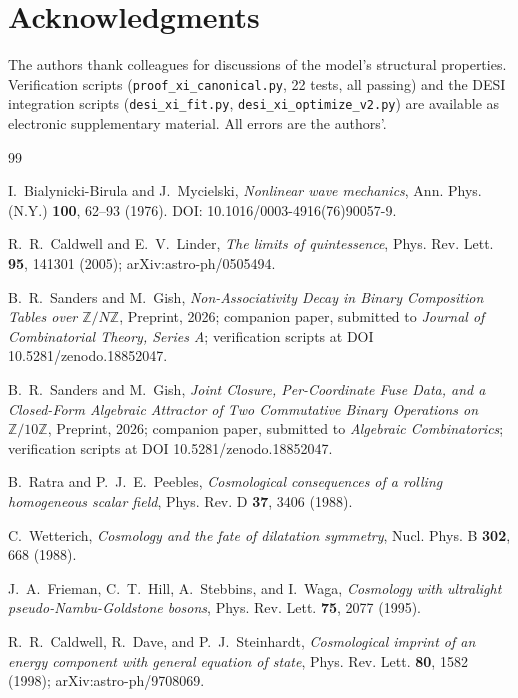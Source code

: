 \documentclass[11pt,reqno]{amsart}
\theoremstyle{plain}
\theoremstyle{definition}
\theoremstyle{remark}
\begin{document}
\section*{Acknowledgments}

The authors thank colleagues for discussions of the model's structural
properties. Verification scripts (\texttt{proof\_xi\_canonical.py}, 22
tests, all passing) and the DESI integration scripts
(\texttt{desi\_xi\_fit.py}, \texttt{desi\_xi\_optimize\_v2.py}) are available
as electronic supplementary material. All errors are the authors'.

\begin{thebibliography}{99}

I.~Bialynicki-Birula and J.~Mycielski,
\emph{Nonlinear wave mechanics},
Ann. Phys. (N.Y.) \textbf{100}, 62--93 (1976).
DOI: 10.1016/0003-4916(76)90057-9.

R.~R.~Caldwell and E.~V.~Linder,
\emph{The limits of quintessence},
Phys. Rev. Lett. \textbf{95}, 141301 (2005); arXiv:astro-ph/0505494.

B.~R.~Sanders and M.~Gish,
\emph{Non-Associativity Decay in Binary Composition Tables over
$\mathbb{Z}/N\mathbb{Z}$},
Preprint, 2026; companion paper, submitted to
\emph{Journal of Combinatorial Theory, Series A};
verification scripts at DOI 10.5281/zenodo.18852047.

B.~R.~Sanders and M.~Gish,
\emph{Joint Closure, Per-Coordinate Fuse Data, and a Closed-Form
Algebraic Attractor of Two Commutative Binary Operations on
$\mathbb{Z}/10\mathbb{Z}$},
Preprint, 2026; companion paper, submitted to
\emph{Algebraic Combinatorics};
verification scripts at DOI 10.5281/zenodo.18852047.

B.~Ratra and P.~J.~E.~Peebles,
\emph{Cosmological consequences of a rolling homogeneous scalar field},
Phys. Rev. D \textbf{37}, 3406 (1988).

C.~Wetterich,
\emph{Cosmology and the fate of dilatation symmetry},
Nucl. Phys. B \textbf{302}, 668 (1988).

J.~A.~Frieman, C.~T.~Hill, A.~Stebbins, and I.~Waga,
\emph{Cosmology with ultralight pseudo-Nambu-Goldstone bosons},
Phys. Rev. Lett. \textbf{75}, 2077 (1995).

R.~R.~Caldwell, R.~Dave, and P.~J.~Steinhardt,
\emph{Cosmological imprint of an energy component with general equation of state},
Phys. Rev. Lett. \textbf{80}, 1582 (1998); arXiv:astro-ph/9708069.


\end{thebibliography}
\end{document}
